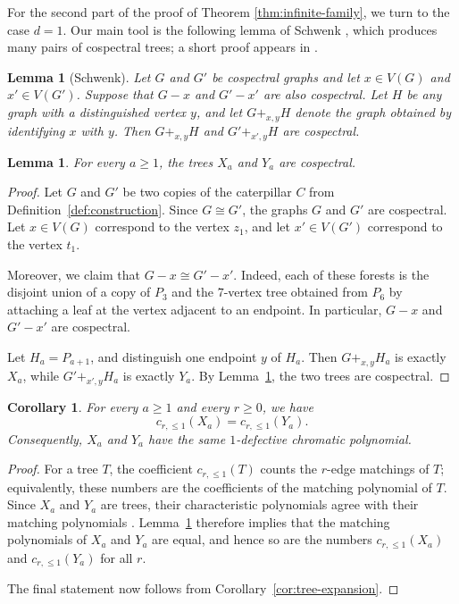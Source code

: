 \documentclass[12pt,reqno]{amsart}
\newtheorem{lem}[thm]{Lemma}
\newtheorem{cor}[thm]{Corollary}
\theoremstyle{definition}
\begin{document}
For the second part of the proof of Theorem \ref{thm:infinite-family}, we turn to the case $d=1$. Our main tool is the following lemma of Schwenk \cite{Schwenk73}, which produces many pairs of cospectral trees; a short proof appears in \cite[Lemma~14.2.1]{BH12}.

\begin{lem}[Schwenk]\label{lem:schwenk}
Let $G$ and $G'$ be cospectral graphs and let $x\in V(G)$ and $x'\in V(G')$. Suppose that $G-x$ and $G'-x'$ are also cospectral. Let $H$ be any graph with a distinguished vertex $y$, and let $G+_{x,y}H$ denote the graph obtained by identifying $x$ with $y$. Then $G+_{x,y}H$ and $G'+_{x',y}H$ are cospectral.
\end{lem}

\begin{lem}\label{lem:cospectral-family}
For every $a\geq 1$, the trees $X_a$ and $Y_a$ are cospectral.
\end{lem}

\begin{proof}
Let $G$ and $G'$ be two copies of the caterpillar $C$ from Definition~\ref{def:construction}. Since $G\cong G'$, the graphs $G$ and $G'$ are cospectral. Let $x\in V(G)$ correspond to the vertex $z_1$, and let $x'\in V(G')$ correspond to the vertex $t_1$.

Moreover, we claim that $G-x \cong G'-x'$. Indeed, each of these forests is the disjoint union of a copy of $P_3$ and the $7$-vertex tree obtained from $P_6$ by attaching a leaf at the vertex adjacent to an endpoint. In particular, $G-x$ and $G'-x'$ are cospectral.

Let $H_a=P_{a+1}$, and distinguish one endpoint $y$ of $H_a$. Then $G+_{x,y}H_a$ is exactly $X_a$, while $G'+_{x',y}H_a$ is exactly $Y_a$. By Lemma~\ref{lem:schwenk}, the two trees are cospectral.
\end{proof}

\begin{cor}\label{cor:matching-family}
For every $a\geq 1$ and every $r\geq 0$, we have
\[
c_{r,\leq 1}(X_a)=c_{r,\leq 1}(Y_a).
\]
Consequently, $X_a$ and $Y_a$ have the same $1$-defective chromatic polynomial.
\end{cor}

\begin{proof}
For a tree $T$, the coefficient $c_{r,\leq 1}(T)$ counts the $r$-edge matchings of $T$; equivalently, these numbers are the coefficients of the matching polynomial of $T$. Since $X_a$ and $Y_a$ are trees, their characteristic polynomials agree with their matching polynomials \cite[Chapter~2]{God93}. Lemma~\ref{lem:cospectral-family} therefore implies that the matching polynomials of $X_a$ and $Y_a$ are equal, and hence so are the numbers $c_{r,\leq 1}(X_a)$ and $c_{r,\leq 1}(Y_a)$ for all $r$.

The final statement now follows from Corollary~\ref{cor:tree-expansion}.
\end{proof}
\end{document}
